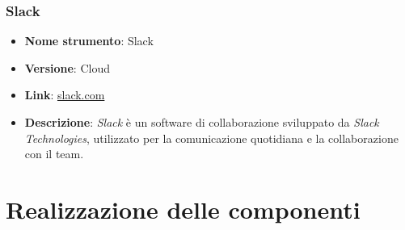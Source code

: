 \subsubsection{Slack}
\begin{itemize}
    \item \textbf{Nome strumento}: Slack
    \item \textbf{Versione}: Cloud
    \item \textbf{Link}: \href{https://slack.com/}{slack.com}
    \item \textbf{Descrizione}: \textit{Slack} è un software di collaborazione sviluppato da \textit{Slack Technologies}, utilizzato per la comunicazione quotidiana e la collaborazione
          con il team.
\end{itemize}

\section{Realizzazione delle componenti}

